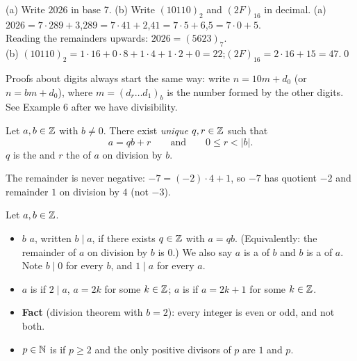 \begin{hexample}[conversions]
(a) Write $2026$ in base 7. \quad (b) Write $(10110)_2$ and $(2F)_{16}$ in decimal.
\solution
(a) $2026=7\cdot289+3$,\quad $289=7\cdot41+2$,\quad $41=7\cdot5+6$,\quad $5=7\cdot0+5$.\\
Reading the remainders upwards: $2026=(5623)_7$.
\\[3pt]
(b) $(10110)_2=1\cdot16+0\cdot8+1\cdot4+1\cdot2+0=22$;\qquad $(2F)_{16}=2\cdot16+15=47$.\qed
\end{hexample}

Proofs about digits always start the same way: write $n=10m+d_0$ (or $n=bm+d_0$), where $m=(d_r\dots d_1)_b$ is the number formed by the other digits. See Example 6 after we have divisibility.


\begin{result}
Let $a,b\in\mathbb{Z}$ with $b\neq0$. There exist \emph{unique} $q,r\in\mathbb{Z}$ such that
\[
a=qb+r\qquad\text{and}\qquad 0\le r<|b|.
\]
$q$ is the  and $r$ the  of $a$ on division by $b$.
\end{result}
The remainder is never negative: $-7=(-2)\cdot4+1$, so $-7$ has quotient $-2$ and remainder $1$ on division by $4$ (not $-3$).

\begin{key}
Let $a,b\in\mathbb{Z}$.
\begin{itemize}
\item $b$  $a$, written $b\mid a$, if there exists $q\in\mathbb{Z}$ with $a=qb$. (Equivalently: the remainder of $a$ on division by $b$ is $0$.) We also say $a$ is a  of $b$ and $b$ is a  of $a$. Note $b\mid 0$ for every $b$, and $1\mid a$ for every $a$.
\item $a$ is  if $2\mid a$, \ie $a=2k$ for some $k\in\mathbb{Z}$; $a$ is  if $a=2k+1$ for some $k\in\mathbb{Z}$.
\item \textbf{Fact} (division theorem with $b=2$): every integer is even or odd, and not both.
\item $p\in\mathbb{N}$ is  if $p\ge2$ and the only positive divisors of $p$ are $1$ and $p$.
\end{itemize}
\end{key}


